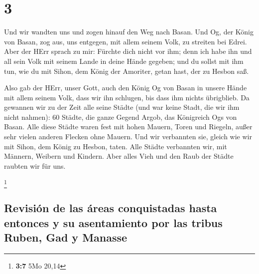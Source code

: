 \hypertarget{section-2}{%
\section{3}\label{section-2}}

 Und wir wandten uns und zogen hinauf den Weg nach Basan.
Und Og, der König von Basan, zog aus, uns entgegen, mit allem seinem
Volk, zu streiten bei Edrei.  Aber der HErr sprach zu mir:
Fürchte dich nicht vor ihm; denn ich habe ihn und all sein Volk mit
seinem Lande in deine Hände gegeben; und du sollst mit ihm tun, wie du
mit Sihon, dem König der Amoriter, getan hast, der zu Hesbon saß.

 Also gab der HErr, unser Gott, auch den König Og von
Basan in unsere Hände mit allem seinem Volk, dass wir ihn schlugen, bis
dass ihm nichts übrigblieb.  Da gewannen wir zu der Zeit
alle seine Städte (und war keine Stadt, die wir ihm nicht nahmen): 60
Städte, die ganze Gegend Argob, das Königreich Ogs von Basan.
 Alle diese Städte waren fest mit hohen Mauern, Toren und
Riegeln, außer sehr vielen anderen Flecken ohne Mauern. 
Und wir verbannten sie, gleich wie wir mit Sihon, dem König zu Hesbon,
taten. Alle Städte verbannten wir, mit Männern, Weibern und Kindern.
 Aber alles Vieh und den Raub der Städte raubten wir für
uns.

\footnote{\textbf{3:7} 5Mo 20,14}

\hypertarget{revisiuxf3n-de-las-uxe1reas-conquistadas-hasta-entonces-y-su-asentamiento-por-las-tribus-ruben-gad-y-manasse}{%
\subsection{Revisión de las áreas conquistadas hasta entonces y su
asentamiento por las tribus Ruben, Gad y
Manasse}\label{revisiuxf3n-de-las-uxe1reas-conquistadas-hasta-entonces-y-su-asentamiento-por-las-tribus-ruben-gad-y-manasse}}

